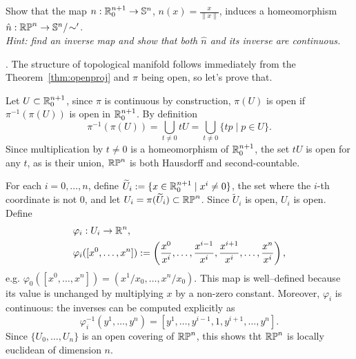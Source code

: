 \begin{example}
  \begin{exercise}\label{exe:RPSN}
    Show that the map $n: \mathbb{R}^{n+1}_0\to \mathbb{S}^n$, $n(x) = \frac{x}{\|x\|}$, induces a homeomorphism $\hat n:\mathbb{RP}^n \to \mathbb{S}^n/\!\sim'$.\\
    \textit{\small Hint: find an inverse map and show that both $\hat n$ and its inverse are continuous.}
  \end{exercise}

  .
  The structure of topological manifold follows immediately from the Theorem~\ref{thm:openproj} and $\pi$ being open, so let's prove that.

  Let $U\subset\mathbb{R}_0^{n+1}$, since $\pi$ is continuous by construction, $\pi(U)$ is open if $\pi^{-1}(\pi(U))$ is open in $\mathbb{R}^{n+1}_0$.
  By definition
  \begin{equation}
    \pi^{-1}(\pi(U)) = \bigcup_{t\neq 0} tU = \bigcup_{t\neq 0}\{tp \mid p\in U\}.
  \end{equation}
  Since multiplication by $t\neq 0$ is a homeomorphism of $\mathbb{R}_0^{n+1}$, the set $t U$ is open for any $t$, as is their union, $\mathbb{RP}^n$ is both Hausdorff and second-countable.

  For each $i=0,\ldots,n$, define $\widetilde U_i := \{x\in\mathbb{R}^{n+1}_0 \mid x^i\neq0\}$, the set where the $i$-th coordinate is not $0$, and let $U_i = \pi(\widetilde U_i)\subset \mathbb{RP}^n$.
  Since $\widetilde U_i$ is open, $U_i$ is open.
  Define
  \begin{align}
     & \varphi_i:U_i\to\mathbb{R}^n,                                                                                                               \\
     & \varphi_i([x^0, \ldots, x^n]):= \left(\frac{x^0}{x^i},\ldots,\frac{x^{i-1}}{x^i},\frac{x^{i+1}}{x^i},\ldots,\frac{x^n}{x^i}\right),
  \end{align}
  e.g. $\varphi_0([x^0, \ldots, x^n]) = (x^1/x_0, \ldots, x^n/x_0)$.
  This map is well--defined because its value is unchanged by multiplying $x$ by a non-zero constant.
  Moreover, $\varphi_i$ is continuous: the inverses can be computed explicitly as
  \begin{equation}
    \varphi_i^{-1}(y^1,\ldots,y^n) = \left[y^1, \ldots, y^{i-1}, 1, y^{i+1}, \ldots, y^n\right].
  \end{equation}
  Since $\{U_0, \ldots, U_n\}$ is an open covering of $\mathbb{RP}^n$, this shows tht $\mathbb{RP}^n$ is locally euclidean of dimension $n$.


\end{example}
